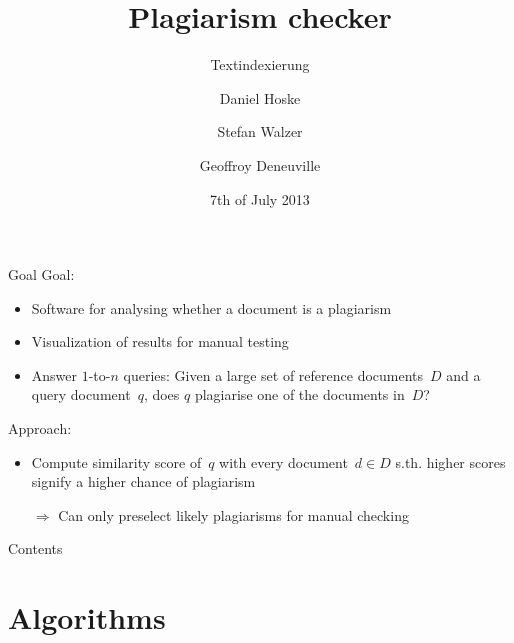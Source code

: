 \documentclass[simple]{mybeamer}
\title{Plagiarism checker}
\subtitle{Textindexierung}
\date{7th of July 2013}
\author{Daniel Hoske \and Stefan Walzer \and Geoffroy Deneuville}
\begin{document}
\maketitle

\begin{frame}{Goal}
    Goal:
    \begin{itemize}
      \item Software for analysing whether a document is a plagiarism
      \item Visualization of results for manual testing
      \item Answer $1$-to-$n$ queries: Given a large set of reference documents~$D$ and a query document~$q$, does $q$ plagiarise one of the documents in~$D$?
    \end{itemize}

    \pause

    Approach:
    \begin{itemize}
      \item Compute similarity score of~$q$ with every document~$d \in D$ s.th. higher
      scores signify a higher chance of plagiarism
      \item[$\Rightarrow$] Can only preselect likely plagiarisms for manual checking
    \end{itemize}
\end{frame}

\begin{frame}{Contents}
  \tableofcontents
\end{frame}

\section{Algorithms}
\end{document}
